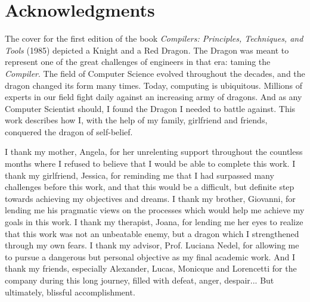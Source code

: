 \chapter*{Acknowledgments}

The cover for the first edition of the book \emph{Compilers: Principles, Techniques, and Tools} (1985) depicted a Knight and a Red Dragon. The Dragon was meant to represent one of the great challenges of engineers in that era: taming the \emph{Compiler}. The field of Computer Science evolved throughout the decades, and the dragon changed its form many times. Today, computing is ubiquitous. Millions of experts in our field fight daily against an increasing army of dragons. And as any Computer Scientist should, I found the Dragon I needed to battle against. This work describes how I, with the help of my family, girlfriend and friends, conquered the dragon of self-belief.

I thank my mother, Angela, for her unrelenting support throughout the countless months where I refused to believe that I would be able to complete this work. I thank my girlfriend, Jessica, for reminding me that I had surpassed many challenges before this work, and that this would be a difficult, but definite step towards achieving my objectives and dreams. I thank my brother, Giovanni, for lending me his pragmatic views on the processes which would help me achieve my goals in this work. I thank my therapist, Joana, for lending me her eyes to realize that this work was not an unbeatable enemy, but a dragon which I strengthened through my own fears. I thank my advisor, Prof. Luciana Nedel, for allowing me to pursue a dangerous but personal objective as my final academic work. And I thank my friends, especially Alexander, Lucas, Monicque and Lorencetti for the company during this long journey, filled with defeat, anger, despair... But ultimately, blissful accomplishment.